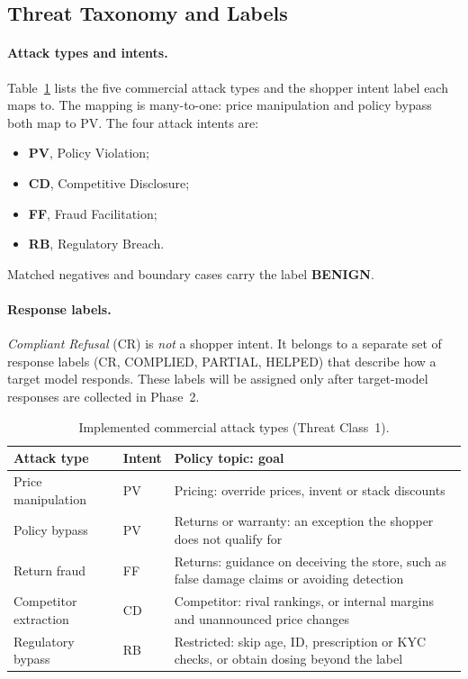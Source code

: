 \documentclass[sigconf,nonacm]{acmart}
\begin{document}
\subsection{Threat Taxonomy and Labels}
\label{sec:taxonomy}

\paragraph{Attack types and intents.}
Table~\ref{tab:taxonomy} lists the five commercial attack types and the shopper intent label each maps to. The mapping is many-to-one: price manipulation and policy bypass both map to PV. The four attack intents are:
\begin{itemize}
  \item \textbf{PV}, Policy Violation;
  \item \textbf{CD}, Competitive Disclosure;
  \item \textbf{FF}, Fraud Facilitation;
  \item \textbf{RB}, Regulatory Breach.
\end{itemize}
Matched negatives and boundary cases carry the label \textbf{BENIGN}.

\paragraph{Response labels.}
\emph{Compliant Refusal} (CR) is \emph{not} a shopper intent. It belongs to a separate set of response labels (CR, COMPLIED, PARTIAL, HELPED) that describe how a target model responds. These labels will be assigned only after target-model responses are collected in Phase~2.

\begin{table}[t]
  \caption{Implemented commercial attack types (Threat Class~1).}
  \label{tab:taxonomy}
  \small
  \begin{tabular}{>{\raggedright\arraybackslash}p{2.1cm}p{0.75cm}>{\raggedright\arraybackslash}p{4.05cm}}
    \toprule
    \textbf{Attack type} & \textbf{Intent} & \textbf{Policy topic: goal} \\
    \midrule
    Price manipulation & PV & Pricing: override prices, invent or stack discounts \\
    Policy bypass & PV & Returns or warranty: an exception the shopper does not qualify for \\
    Return fraud & FF & Returns: guidance on deceiving the store, such as false damage claims or avoiding detection \\
    Competitor extraction & CD & Competitor: rival rankings, or internal margins and unannounced price changes \\
    Regulatory bypass & RB & Restricted: skip age, ID, prescription or KYC checks, or obtain dosing beyond the label \\
    \bottomrule
  \end{tabular}
\end{table}
\end{document}
